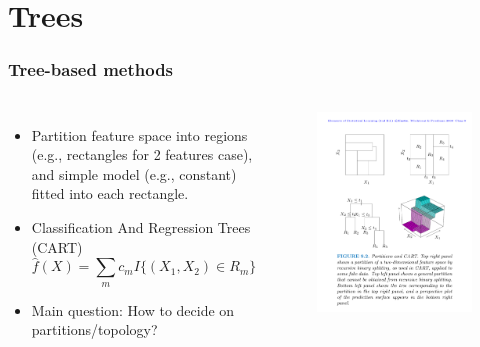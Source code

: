\documentclass[aspectratio=169]{beamer}
\begin{document}
\section{Trees}

\begin{frame}
\frametitle{Tree-based methods}
\begin{columns}
\begin{itemize}
        \item Partition feature space into regions (e.g., rectangles for 2 features case), and simple model (e.g., constant) fitted into each rectangle.
        \item Classification And Regression Trees (CART)
        \begin{equation*}
            \hat{f}(X) = \sum_{m} c_m I\{(X_1,X_2) \in R_m\}
        \end{equation*}
        \item Main question: How to decide on partitions/topology?
\end{itemize}
\begin{figure}
            \centering
            \includegraphics[width=\textwidth]{figures/cart.pdf}
        \end{figure}
\end{columns}
\end{frame}
\end{document}
